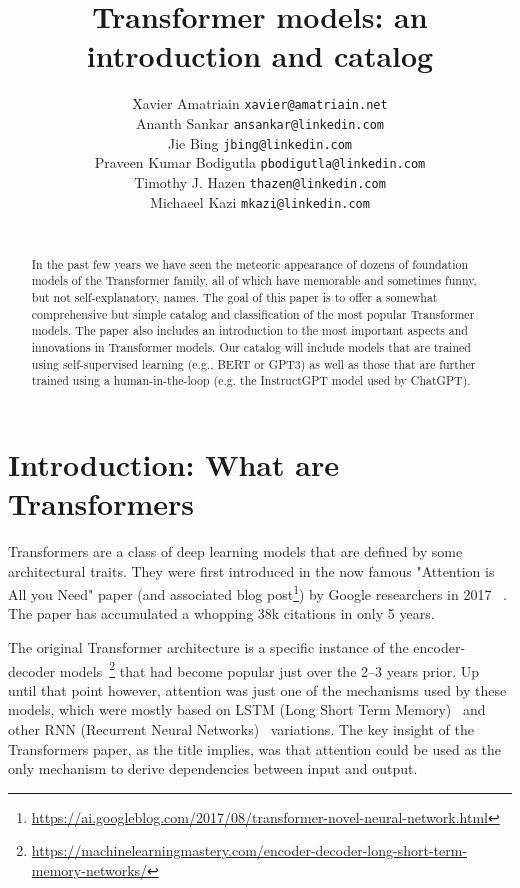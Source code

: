 \documentclass{article}
\title{Transformer models: an introduction and catalog}
\author{
 Xavier Amatriain  \texttt{xavier@amatriain.net} \\
 Ananth Sankar \texttt{ansankar@linkedin.com} \\
  Jie Bing \texttt{jbing@linkedin.com} \\
  Praveen Kumar Bodigutla \texttt{pbodigutla@linkedin.com} \\
  Timothy J. Hazen  \texttt{thazen@linkedin.com} \\
  Michaeel Kazi \texttt{mkazi@linkedin.com} \\ \\
}
\begin{document}
\maketitle
\begin{abstract}
In the past few years we have seen the meteoric appearance of dozens 
of foundation models of the Transformer family, all of which have memorable and 
sometimes funny, but not self-explanatory, names. The goal of this paper is to offer a somewhat comprehensive but simple catalog and 
classification of the most popular Transformer models. The paper also 
includes an introduction to the most important aspects and innovations in Transformer models. 
Our catalog will include models that are trained using self-supervised learning (e.g., BERT or GPT3) as well as those that are further trained using a human-in-the-loop (e.g. the InstructGPT model used by ChatGPT).
\end{abstract}

\tableofcontents



\section{Introduction: What are Transformers}

Transformers are a class of deep learning models that are defined by some architectural traits. They were first introduced in the now famous "Attention is All you Need" paper (and associated blog 
post\footnote{\protect\url{https://ai.googleblog.com/2017/08/transformer-novel-neural-network.html}}) by Google researchers in 2017 \protect~. The paper has accumulated a whopping 38k citations in only 5 years.

The original Transformer architecture is a specific instance of the encoder-decoder 
models~\footnote{\protect\url{https://machinelearningmastery.com/encoder-decoder-long-short-term-memory-networks/}} that had become popular just over the 2–3 years prior. Up until that point however, attention was just one of the mechanisms used by these models, which were mostly based on LSTM (Long Short Term Memory)~ and other RNN (Recurrent Neural Networks)~ variations. The key insight of the Transformers paper, as the title implies, was that attention could be used as the only mechanism to derive dependencies between input and output.
\end{document}
